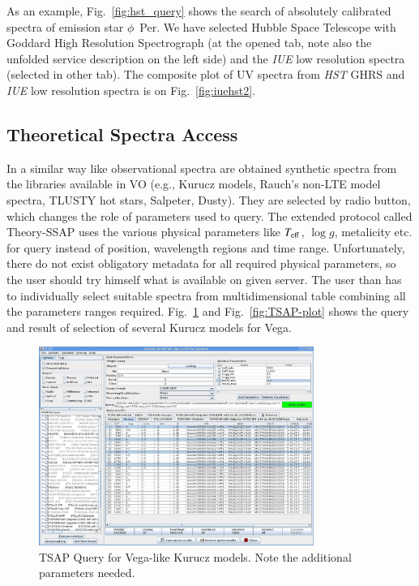 \documentclass[final,authoryear,5p,times,twocolumn]{elsarticle}
\begin{document}
As an example, Fig.~\ref{fig:hst_query} shows the search of
absolutely calibrated spectra of emission star $\phi$~Per. We have
selected Hubble Space Telescope with Goddard High Resolution
Spectrograph (at the opened tab, note also the unfolded service
description on the left side) and the \emph{IUE} low resolution spectra
(selected in other tab).  The composite plot of UV spectra from \emph{HST}
GHRS  and \emph{IUE} low resolution spectra is on Fig.~\ref{fig:iuehst2}.

\subsection{ Theoretical Spectra Access}

In a similar way like observational spectra  are obtained synthetic spectra
from the libraries  available in VO (e.g., Kurucz models, Rauch's non-LTE model
spectra, TLUSTY hot stars, Salpeter, Dusty). They are selected by radio
button, which  changes the role of parameters used to query. The extended
protocol called Theory-SSAP \citep[hereafter TSAP;][]{ssap} uses  the various
physical parameters like $T_{\rm eff}$, $\log g$, metalicity etc. for query
instead of position, wavelength regions and time range. Unfortunately, there do
not exist obligatory metadata for all required physical parameters, so the user should try
himself what is available on given server.  The user than has to individually
select suitable spectra from multidimensional table combining all the
parameters ranges required.  Fig.~\ref{fig:TSAP-query} and
Fig.~\ref{fig:TSAP-plot} shows the query and result of selection of several Kurucz models for
Vega.


\begin{figure}[t]
\begin{center}
\includegraphics[width=0.8\textwidth]{TSSA-query.pdf}
\caption{TSAP Query for Vega-like Kurucz models. Note the additional parameters needed.}
\label{fig:TSAP-query}
\end{center}
\end{figure}
\end{document}
